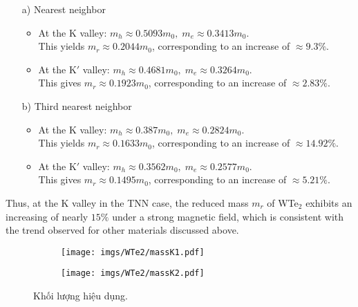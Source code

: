 \documentclass{article}
\begin{document}
\begin{itemize}
	\item[a)] Nearest neighbor
	\begin{itemize}
		\item At the K valley: $m_{h} \approx 0.5093 m_{0},\; m_{e} \approx 0.3413 m_{0}$. \\
		This yields $m_{r} \approx 0.2044 m_{0}$, corresponding to an increase of $\approx 9.3\%$.  
		
		\item At the K$'$ valley: $m_{h} \approx 0.4681 m_{0},\; m_{e} \approx 0.3264 m_{0}$. \\
		This gives $m_{r} \approx 0.1923 m_{0}$, corresponding to an increase of $\approx 2.83\%$.  
	\end{itemize}
	\item[b)] Third nearest neighbor
	\begin{itemize}
		\item At the K valley: $m_{h} \approx 0.387 m_{0},\; m_{e} \approx 0.2824 m_{0}$. \\
		This yields $m_{r} \approx 0.1633 m_{0}$, corresponding to an increase of $\approx 14.92\%$.  
		
		\item At the K$'$ valley: $m_{h} \approx 0.3562 m_{0},\; m_{e} \approx 0.2577 m_{0}$. \\
		This gives $m_{r} \approx 0.1495 m_{0}$, corresponding to an increase of $\approx 5.21\%$.  
	\end{itemize}
\end{itemize}

Thus, at the K valley in the TNN case, the reduced mass $m_r$ of WTe$_{2}$ exhibits an increasing of nearly $15\%$ under a strong magnetic field, which is consistent with the trend observed for other materials discussed above.  

\begin{figure}[htb]
	\begin{subfigure}{0.495\textwidth}
		\centering
		\texttt{[image: imgs/WTe2/massK1.pdf]}
	\end{subfigure}
	\begin{subfigure}{0.495\textwidth}
		\centering
		\texttt{[image: imgs/WTe2/massK2.pdf]}
	\end{subfigure}
	\caption{Khối lượng hiệu dụng.}
\end{figure}

\newpage



\end{document}
